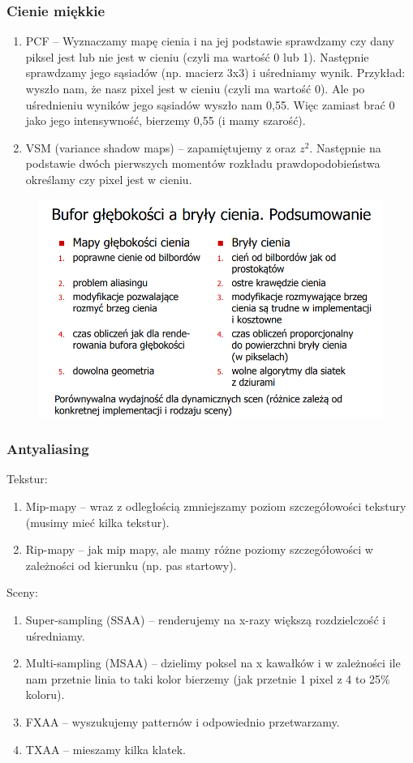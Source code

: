 \documentclass[12pt]{article}
\begin{document}
\subsubsection{Cienie miękkie}
\begin{enumerate}
	\item PCF -- Wyznaczamy mapę cienia i na jej podstawie sprawdzamy czy dany piksel jest lub nie jest w cieniu (czyli ma wartość 0 lub 1). Następnie sprawdzamy jego sąsiadów (np. macierz 3x3) i uśredniamy wynik. Przykład: wyszło nam, że nasz pixel jest w cieniu (czyli ma wartość 0). Ale po uśrednieniu wyników jego sąsiadów wyszło nam 0,55. Więc zamiast brać 0 jako jego intensywność, bierzemy 0,55 (i mamy szarość).
	\item VSM (variance shadow maps) -- zapamiętujemy z oraz $z^2$. Następnie na podstawie dwóch pierwszych momentów rozkładu prawdopodobieństwa określamy czy pixel jest w cieniu.
\end{enumerate}

\begin{figure}[H]
	\centering
	\includegraphics[scale=0.5]{Pictures/shadows_comparison.png}
	\caption{}
\end{figure}

\subsubsection{Antyaliasing}
Tekstur:
\begin{enumerate}
	\item Mip-mapy -- wraz z odległością zmniejszamy poziom szczegółowości tekstury (musimy mieć kilka tekstur).
	\item Rip-mapy -- jak mip mapy, ale mamy różne poziomy szczegółowości w zależności od kierunku (np. pas startowy).
\end{enumerate}
Sceny:
\begin{enumerate}
	\item Super-sampling (SSAA) -- renderujemy na x-razy większą rozdzielczość i uśredniamy.
	\item Multi-sampling (MSAA) -- dzielimy poksel na x kawałków i w zależności ile nam przetnie linia to taki kolor bierzemy (jak przetnie 1 pixel z 4 to 25\% koloru).
	\item FXAA -- wyszukujemy patternów i odpowiednio przetwarzamy.
	\item TXAA -- mieszamy kilka klatek.
\end{enumerate}
\end{document}
